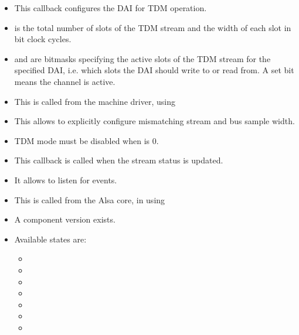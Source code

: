 \begin{frame}{}
  \begin{itemize}
  \item This callback configures the DAI for TDM operation.
  \item {} is the total number of slots of the TDM stream and
     the width of each slot in bit clock cycles.
  \item {} and  are bitmasks specifying the
    active slots of the TDM stream for the specified DAI, i.e. which slots the
    DAI should write to or read from. A set bit means the channel is
    active.
  \item This is called from the machine driver, using
  \item This allows to explicitly configure mismatching stream and bus
    sample width.
  \item TDM mode must be disabled when  is 0.
  \end{itemize}
\end{frame}

\begin{frame}{}
  \begin{itemize}
  \item This callback is called when the stream status is updated.
  \item It allows to listen for events.
  \item This is called from the Alsa core, in 
    using 
  \item A component version exists.
  \item Available states are:
    \begin{itemize}
    \item {}
    \item {}
    \item {}
    \item {}
    \item {}
    \item {}
    \item {}
    \end{itemize}
  \end{itemize}
\end{frame}

